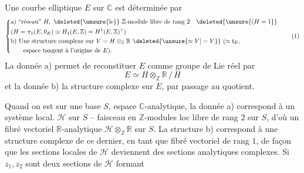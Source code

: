 
Une courbe elliptique $E$ sur $\mathbb{C}$ est déterminée par
\[
\left\{\begin{aligned}
&\text{a) ``réseau'' }H,\ \deleted{\unsure{\text{le}}}\ \mathbb{Z}\text{-module libre de rang }2\quad\deleted{\unsure{(H=1}}\\
&(H=\pi_1(E,0_E)\simeq H_1(E,\mathbb{Z})=H^1(E,\mathbb{Z})^\vee)\\
&\text{b) Une structure complexe sur }V=H\otimes_{\mathbb{Z}}\mathbb{R}\ \deleted{\unsure{\simeq V|=V}}\ (\simeq\mathfrak{t}_E,\\
&\qquad\text{espace tangent à l'origine de }E).
\end{aligned}\right.
\tag*{(1)}
\]
La donnée a) permet de reconstituer $E$ comme groupe de Lie réel par
\[
E\simeq H\otimes_{\mathbb{Z}}\mathbb{R}\,/\,H
\tag*{(2)}
\]
et la donnée b)  la structure complexe sur $E$, par passage au quotient.

Quand on est sur une base $S$, espace $\mathbb{C}$-analytique, la donnée a) correspond à un système local. $\mathscr{H}$ sur $S$ -- faisceau en $\mathbb{Z}$-modules loc libre de rang $2$ sur $S$, d'où un fibré vectoriel $\mathbb{R}$-analytique $\mathscr{H}\otimes_{\mathbb{Z}}\mathbb{R}$ sur $S$. La structure b) correspond à une structure complexe  de ce dernier, en tant que fibré vectoriel  de rang $1$, de façon que les sections locales de $\mathscr{H}$ deviennent des sections analytiques complexes. Si  $z_1,z_2$ sont deux sections de $\mathscr{H}$ formant

